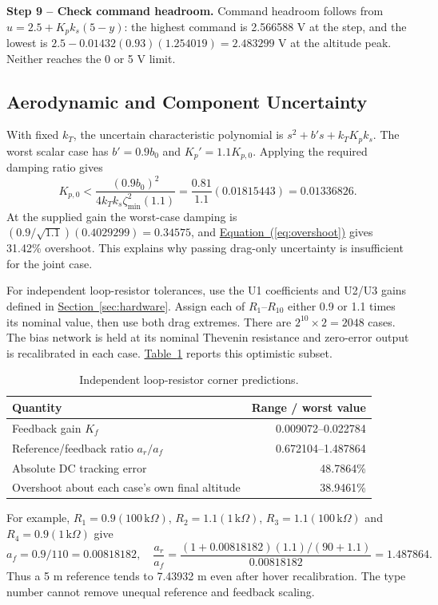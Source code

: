 \documentclass[12pt,a4paper]{article}
\numberwithin{equation}{section}
\newcommand{\page}{\clearpage}
\newcommand{\Tref}[1]{\hyperref[#1]{Table~\ref*{#1}}}
\newcommand{\Sref}[1]{\hyperref[#1]{Section~\ref*{#1}}}
\newcommand{\Eref}[1]{\hyperref[#1]{Equation~(\ref*{#1})}}
\newcommand{\thead}{\rowcolor{AngelBlue!28}}
\begin{document}
\textbf{Step 9 -- Check command headroom.} Command headroom follows from $u=2.5+K_pk_s(5-y)$: the highest command is 2.566588 V at the step, and the lowest is $2.5-0.01432(0.93)(1.254019)=2.483299$ V at the altitude peak. Neither reaches the 0 or 5 V limit.
\page

\subsection{Aerodynamic and Component Uncertainty}
With fixed $k_T$, the uncertain characteristic polynomial is $s^2+b's+k_TK_pk_s$. The worst scalar case has $b'=0.9b_0$ and $K_p'=1.1K_{p,0}$. Applying the required damping ratio gives
\begin{equation}\label{eq:jointbound}
K_{p,0}<\frac{(0.9b_0)^2}{4k_Tk_s\zeta_{\min}^2(1.1)}
=\frac{0.81}{1.1}(0.01815443)=0.01336826.
\end{equation}
At the supplied gain the worst-case damping is $(0.9/\sqrt{1.1})(0.4029299)=0.34575$, and \Eref{eq:overshoot} gives 31.42\% overshoot. This explains why passing drag-only uncertainty is insufficient for the joint case.

For independent loop-resistor tolerances, use the U1 coefficients and U2/U3 gains defined in \Sref{sec:hardware}. Assign each of $R_1$--$R_{10}$ either 0.9 or 1.1 times its nominal value, then use both drag extremes. There are $2^{10}\times2=2048$ cases. The bias network is held at its nominal Thevenin resistance and zero-error output is recalibrated in each case. \Tref{tab:corners} reports this optimistic subset.
\begin{table}[H]\centering\small
\caption{Independent loop-resistor corner predictions.}\label{tab:corners}
\begin{tabularx}{\linewidth}{Xr}\toprule\thead
Quantity & Range / worst value\\\midrule
Feedback gain $K_f$ & 0.009072--0.022784\\
Reference/feedback ratio $a_r/a_f$ & 0.672104--1.487864\\
Absolute DC tracking error & 48.7864\%\\
Overshoot about each case's own final altitude & 38.9461\%\\\bottomrule
\end{tabularx}\end{table}
For example, $R_1=0.9(100\,\mathrm{k}\Omega)$, $R_2=1.1(1\,\mathrm{k}\Omega)$, $R_3=1.1(100\,\mathrm{k}\Omega)$ and $R_4=0.9(1\,\mathrm{k}\Omega)$ give
\begin{equation}
a_f=0.9/110=0.00818182,\quad
\frac{a_r}{a_f}=\frac{(1+0.00818182)(1.1)/(90+1.1)}{0.00818182}=1.487864.
\end{equation}
Thus a 5 m reference tends to 7.43932 m even after hover recalibration. The type number cannot remove unequal reference and feedback scaling.
\page
\end{document}
